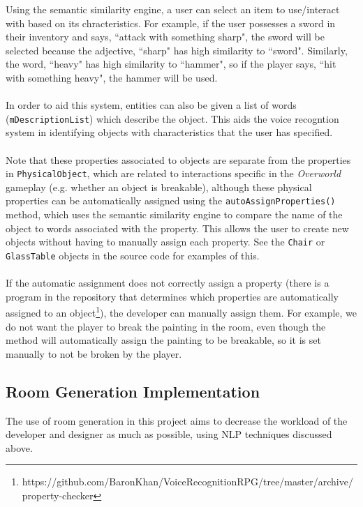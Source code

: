\documentclass[11pt]{article}
\begin{document}
Using the semantic similarity engine, a user can select an item to use/interact with based on its chracteristics. For example, if the user possesses a sword in their inventory and says, ``attack with something sharp", the sword will be selected because the adjective, ``sharp" has high similarity to ``sword". Similarly, the word, ``heavy" has high similarity to ``hammer", so if the player says, ``hit with something heavy", the hammer will be used.
\\
\\
In order to aid this system, entities can also be given a list of words (\texttt{mDescriptionList}) which describe the object.  This aids the voice recogntion system in identifying objects with characteristics that the user has specified.
\\
\\
Note that these properties associated to objects are separate from the properties in \texttt{PhysicalObject}, which are related to interactions specific in the \textit{Overworld} gameplay (e.g. whether an object is breakable), although these physical properties can be automatically assigned using the \texttt{autoAssignProperties()} method, which uses the semantic similarity engine to compare the name of the object to words associated with the property. This allows the user to create new objects without having to manually assign each property. See the \texttt{Chair} or \texttt{GlassTable} objects in the source code for examples of this.
\\
\\
If the automatic assignment does not correctly assign a property (there is a program in the repository that determines which properties are automatically assigned  to an object\footnote{https://github.com/BaronKhan/VoiceRecognitionRPG/tree/master/archive/property-checker}), the developer can manually assign them. For example, we do not want the player to break the painting in the room, even though the method will automatically assign the painting to be breakable, so it is set manually to not be broken by the player.

\label{section:obj-properties-wordnet}

\subsection{Room Generation Implementation}
\label{section:room-generation}

The use of room generation in this project aims to decrease the workload of the developer and designer as much as possible, using NLP techniques discussed above.
\end{document}
